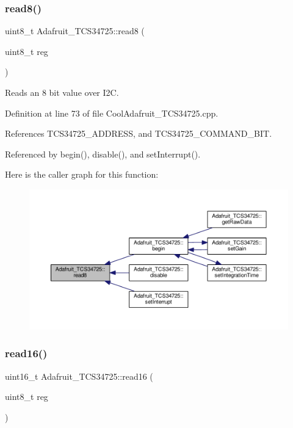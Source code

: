 \subsubsection{\texorpdfstring{read8()}{read8()}}
{\footnotesize\ttfamily uint8\+\_\+t Adafruit\+\_\+\+T\+C\+S34725\+::read8 (\begin{DoxyParamCaption}\item[{uint8\+\_\+t}]{reg }\end{DoxyParamCaption})}



Reads an 8 bit value over I2C. 



Definition at line 73 of file Cool\+Adafruit\+\_\+\+T\+C\+S34725.\+cpp.



References T\+C\+S34725\+\_\+\+A\+D\+D\+R\+E\+SS, and T\+C\+S34725\+\_\+\+C\+O\+M\+M\+A\+N\+D\+\_\+\+B\+IT.



Referenced by begin(), disable(), and set\+Interrupt().

Here is the caller graph for this function\+:
\nopagebreak
\begin{figure}[H]
\begin{center}
\leavevmode
\includegraphics[width=350pt]{df/d54/class_adafruit___t_c_s34725_a3ffafbdd475d6baf9abda8dd067b5319_icgraph}
\end{center}
\end{figure}
\mbox{\label{class_adafruit___t_c_s34725_a6b9b65ff0f1e57797a1c05a43fd25385}} 
\subsubsection{\texorpdfstring{read16()}{read16()}}
{\footnotesize\ttfamily uint16\+\_\+t Adafruit\+\_\+\+T\+C\+S34725\+::read16 (\begin{DoxyParamCaption}\item[{uint8\+\_\+t}]{reg }\end{DoxyParamCaption})}



